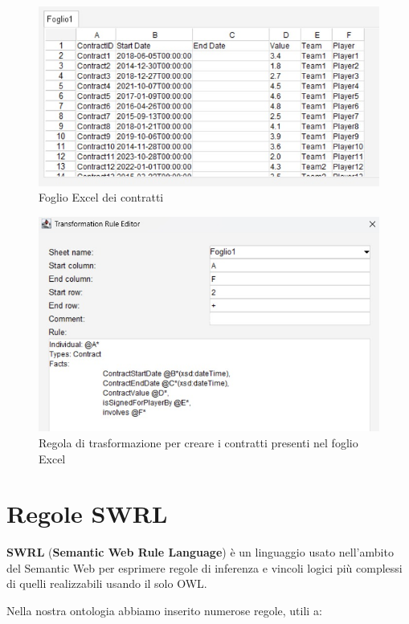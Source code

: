 \documentclass[11pt]{report} %
\begin{document}
\hfill

\begin{figure}[H]
    \centering
    \includegraphics[width=0.9\linewidth]{EXCELCONTRACT.jpeg}
    \caption{Foglio Excel dei contratti}
\end{figure}

\begin{figure}[H]
    \centering
    \includegraphics[width=0.9\linewidth]{RULECELLFIE.jpeg}
    \caption{Regola di trasformazione per creare i contratti presenti nel foglio Excel}
\end{figure}

\chapter{Regole SWRL}

\textbf{SWRL} (\textbf{Semantic Web Rule Language}) è un linguaggio usato nell'ambito del Semantic Web per esprimere regole di inferenza e vincoli logici più complessi di quelli realizzabili usando il solo OWL.

\hfill

Nella nostra ontologia abbiamo inserito numerose regole, utili a:
\end{document}
